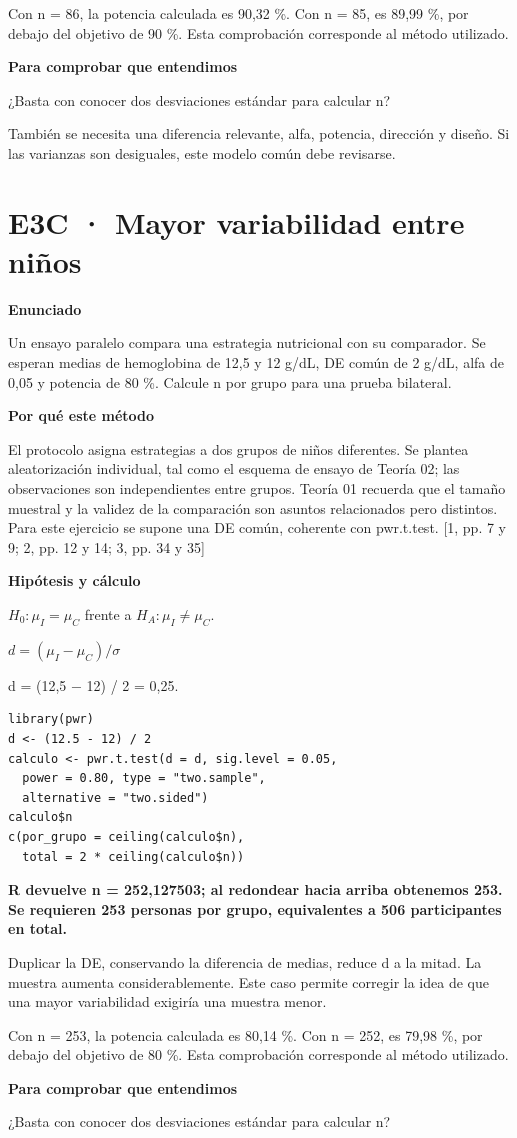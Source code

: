 \documentclass[10pt,a4paper]{article}
\newcommand{\etiqueta}[1]{\par{\bfseries\color{Blue}#1}\par}
\newcommand{\cajares}[1]{\par\colorbox{Pale}{\parbox{\dimexpr\linewidth-2\fboxsep}{\vspace{4pt}\textbf{\color{Navy}#1}\vspace{4pt}}}\par}
\begin{document}
{\small\color{Gray}Con n = 86, la potencia calculada es 90,32 \%. Con n = 85, es 89,99 \%, por debajo del objetivo de 90 \%. Esta comprobación corresponde al método utilizado.}
\etiqueta{Para comprobar que entendimos}
¿Basta con conocer dos desviaciones estándar para calcular n?

{\small También se necesita una diferencia relevante, alfa, potencia, dirección y diseño. Si las varianzas son desiguales, este modelo común debe revisarse.}
\clearpage
\section*{E3C · Mayor variabilidad entre niños}
\etiqueta{Enunciado}
Un ensayo paralelo compara una estrategia nutricional con su comparador. Se esperan medias de hemoglobina de 12,5 y 12 g/dL, DE común de 2 g/dL, alfa de 0,05 y potencia de 80 \%. Calcule n por grupo para una prueba bilateral.
\etiqueta{Por qué este método}
El protocolo asigna estrategias a dos grupos de niños diferentes. Se plantea aleatorización individual, tal como el esquema de ensayo de Teoría 02; las observaciones son independientes entre grupos. Teoría 01 recuerda que el tamaño muestral y la validez de la comparación son asuntos relacionados pero distintos. Para este ejercicio se supone una DE común, coherente con pwr.t.test. [1, pp. 7 y 9; 2, pp. 12 y 14; 3, pp. 34 y 35]
\etiqueta{Hipótesis y cálculo}
$H_0:\mu_I=\mu_C$ frente a $H_A:\mu_I\ne\mu_C$.

$d=(\mu_I-\mu_C)/\sigma$

d = (12,5 \ensuremath{-} 12) / 2 = 0,25.
\begin{Verbatim}
library(pwr)
d <- (12.5 - 12) / 2
calculo <- pwr.t.test(d = d, sig.level = 0.05,
  power = 0.80, type = "two.sample",
  alternative = "two.sided")
calculo$n
c(por_grupo = ceiling(calculo$n),
  total = 2 * ceiling(calculo$n))
\end{Verbatim}
\cajares{R devuelve n = 252,127503; al redondear hacia arriba obtenemos 253. Se requieren 253 personas por grupo, equivalentes a 506 participantes en total.}
Duplicar la DE, conservando la diferencia de medias, reduce d a la mitad. La muestra aumenta considerablemente. Este caso permite corregir la idea de que una mayor variabilidad exigiría una muestra menor.

{\small\color{Gray}Con n = 253, la potencia calculada es 80,14 \%. Con n = 252, es 79,98 \%, por debajo del objetivo de 80 \%. Esta comprobación corresponde al método utilizado.}
\etiqueta{Para comprobar que entendimos}
¿Basta con conocer dos desviaciones estándar para calcular n?
\end{document}
